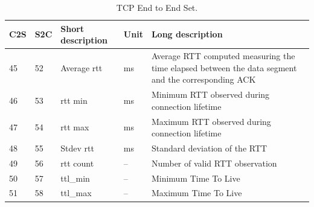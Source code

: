 \documentclass[a4paper,10pt]{article}
\newcommand{\TableFont}{\footnotesize}
\begin{document}
\begin{table}[tp]
	\caption{TCP End to End Set.}\label{tab:TStattcprtt}
	\TableFont{
		\begin{center}
			\begin{tabular*}{1\textwidth}{|l|l|l|l|p{}}
				\toprule
				\cellcolor{BrightYellow}\textbf{C2S}		& \cellcolor{BrightYellow}\textbf{S2C} & \cellcolor{BrightYellow}\textbf{Short description} & \cellcolor{BrightYellow}\textbf{Unit}	& \cellcolor{BrightYellow}\textbf{Long description}\\ \midrule
				45	& 52	& Average rtt	& \si{\milli\second}	& Average RTT computed measuring the time elapsed between the data segment and the corresponding ACK\\ \hline
				46	& 53	& rtt min		& \si{\milli\second}	& Minimum RTT observed during connection lifetime\\ \hline
				47	& 54	& rtt max		& \si{\milli\second}	& Maximum RTT observed during connection lifetime\\ \hline
				48	& 55	& Stdev rtt		& \si{\milli\second}	& Standard deviation of the RTT\\ \hline
				49	& 56	& rtt count		& --					& Number of valid RTT observation\\ \hline
				50	& 57	& ttl\_min		& --					& Minimum Time To Live\\
				51	& 58	& ttl\_max		& --					& Maximum Time To Live\\
				\bottomrule
			\end{tabular*}
		\end{center}
	}
	\end {table}
\end{document}
